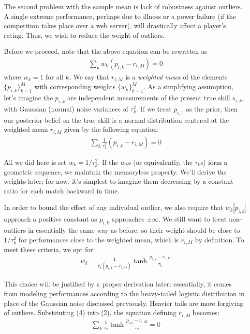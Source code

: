 \documentclass{article}
\begin{document}
The second problem with the sample mean is lack of robustness against outliers. A single extreme performance, perhaps due to illness or a power failure (if the competition takes place over a web server), will drastically affect a player's rating. Thus, we wish to reduce the weight of outliers.

Before we proceed, note that the above equation can be rewritten as
\begin{align}
\sum_k w_k(p_{i,k} - r_{i,M}) = 0
\end{align}
where $w_k = 1$ for all $k$. We say that $r_{i,M}$ is a \emph{weighted mean} of the elements $\{p_{i,k}\}_{k=1}^{M}$ with corresponding weights $\{w_k\}_{k=1}^M$. As a simplifying assumption, let's imagine the $p_{i,k}$ are independent measurements of the present true skill $s_{i,k}$, with Gaussian (normal) noise variances of $\tau_k^2$. If we treat $p_{i,1}$ as the prior, then our posterior belief on the true skill is a normal distribution centered at the weighted mean $r_{i,M}$ given by the following equation:
\begin{align}
\sum_k \frac{1}{\tau_k^2} (p_{i,k} - r_{i,M}) = 0
\end{align}

All we did here is set $w_k = 1/\tau_k^2$. If the $w_k$s (or equivalently, the $\tau_k$s) form a geometric sequence, we maintain the memoryless property. We'll derive the weights later; for now, it's simplest to imagine them decreasing by a constant ratio for each match backward in time.

In order to bound the effect of any individual outlier, we also require that $w_k|p_{i,k}|$ approach a positive constant as $p_{i,k}$ approaches $\pm\infty$. We still want to treat non-outliers in essentially the same way as before, so their weight should be close to $1/\tau_k^2$ for performances close to the weighted mean, which is $r_{i,M}$ by definition. To meet these criteria, we opt for
\begin{align}
w_k = \frac{1}{\tau_k(p_{i,k} - r_{i,M})} \tanh\frac{p_{i,k} - r_{i,M}}{\tau_k}
\end{align}

This choice will be justified by a proper derivation later: essentially, it comes from modeling performances according to the heavy-tailed logistic distribution in place of the Gaussian noise discussed previously. Heavier tails are more forgiving of outliers. Substituting (4) into (2), the equation defining $r_{i,M}$ becomes:
\begin{align}
\sum_k \frac {1}{\tau_k} \tanh\frac{p_{i,k} - r_{i,M}}{\tau_k} = 0
\end{align}
\end{document}
